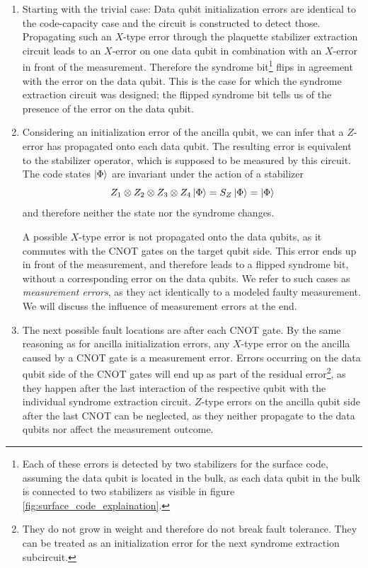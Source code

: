\begin{enumerate}

\item Starting with the trivial case:
Data qubit initialization errors are identical to the code-capacity case and the circuit is constructed to detect those.
Propagating such an $X$-type error through the plaquette stabilizer extraction circuit leads to an $X$-error on one data qubit 
in combination with an $X$-error in front of the measurement.
Therefore the syndrome bit\footnote{
    Each of these errors is detected by two stabilizers for the surface code, assuming the data qubit is located in the bulk,
    as each data qubit in the bulk is connected to two stabilizers as visible in figure \ref{fig:surface_code_explaination}. 
} flips in agreement with the error on the data qubit. 
This is the case for which the syndrome extraction circuit was designed; the flipped syndrome bit tells us of the presence of the error on the data qubit.

\item Considering an initialization error of the ancilla qubit, we can infer that a $Z$-error has propagated onto each data qubit.
The resulting error is equivalent to the stabilizer operator, which is supposed to be measured by this circuit.
The code states $\ket{\Phi}$ are invariant under the action of a stabilizer
\begin{equation}
     Z_1 \otimes Z_2 \otimes Z_3 \otimes Z_4\ket{\Phi}  = S_Z \ket{\Phi} = \ket{\Phi}
\end{equation} 
and therefore neither the state nor the syndrome changes.

A possible $X$-type error is not propagated onto the data qubits, as it commutes with the CNOT gates on the target qubit side.
This error ends up in front of the measurement, and therefore leads to a flipped syndrome bit, without a corresponding error on the data qubits.
We refer to such cases as \emph{measurement errors}, as they act identically to a modeled faulty measurement. 
We will discuss the influence of measurement errors at the end.

\item The next possible fault locations are after each CNOT gate.
By the same reasoning as for ancilla initialization errors, any $X$-type error on the ancilla caused by a CNOT gate is a measurement error.
Errors occurring on the data qubit side of the CNOT gates will end up as part of the residual error\footnote{
    They do not grow in weight and therefore do not break fault tolerance. 
    They can be treated as an initialization error for the next syndrome extraction subcircuit. 
}, as they happen after the last interaction of the respective qubit with the individual syndrome extraction circuit.
$Z$-type errors on the ancilla qubit side after the last CNOT can be neglected, as they neither propagate to the data qubits nor affect the measurement outcome.


\end{enumerate}
